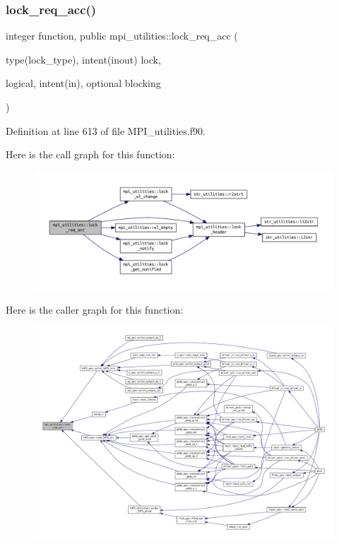 \subsubsection{\texorpdfstring{lock\+\_\+req\+\_\+acc()}{lock\_req\_acc()}}
{\footnotesize\ttfamily integer function, public mpi\+\_\+utilities\+::lock\+\_\+req\+\_\+acc (\begin{DoxyParamCaption}\item[{type(lock\+\_\+type), intent(inout)}]{lock,  }\item[{logical, intent(in), optional}]{blocking }\end{DoxyParamCaption})}



Definition at line 613 of file M\+P\+I\+\_\+utilities.\+f90.

Here is the call graph for this function\+:
\nopagebreak
\begin{figure}[H]
\begin{center}
\leavevmode
\includegraphics[width=350pt]{namespacempi__utilities_a5a789d05be41d6109c01f46cc98620c8_cgraph}
\end{center}
\end{figure}
Here is the caller graph for this function\+:
\nopagebreak
\begin{figure}[H]
\begin{center}
\leavevmode
\includegraphics[width=350pt]{namespacempi__utilities_a5a789d05be41d6109c01f46cc98620c8_icgraph}
\end{center}
\end{figure}
\mbox{\label{namespacempi__utilities_a86f9982a0f92b51a916f832d9a3d8ba9}} 
